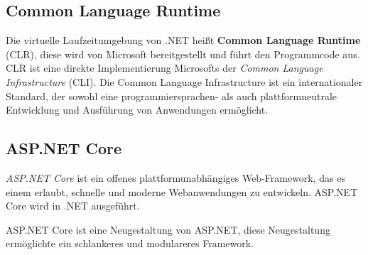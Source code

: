\subsection{Common Language Runtime}
Die virtuelle Laufzeitumgebung von .NET heißt \textbf{Common Language Runtime} (CLR), diese wird von 
Microsoft bereitgestellt und führt den Programmcode aus.
CLR ist eine direkte Implementierung Microsofts der \textit{Common Language Infrastructure} (CLI).
Die Common Language Infrastructure ist ein internationaler Standard, der sowohl eine 
programmiersprachen- als auch plattformneutrale Entwicklung und Ausführung von Anwendungen ermöglicht.  

\subsection{ASP.NET Core}
\textit{ASP.NET Core} ist ein offenes plattformunabhängiges Web-Framework, das es einem erlaubt,
schnelle und moderne Webanwendungen zu entwickeln. ASP.NET Core wird in .NET ausgeführt.

ASP.NET Core ist eine Neugestaltung von ASP.NET, diese Neugestaltung ermöglichte ein 
schlankeres und modulareres Framework. 